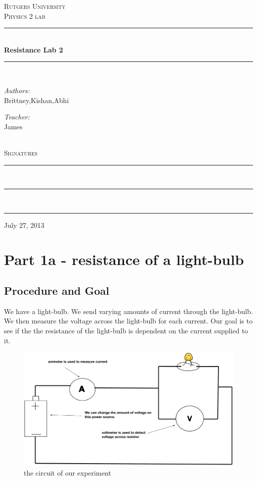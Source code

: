 \documentclass[12pt]{article}
\begin{document}
\begin{titlepage}
\begin{center}
	\textsc{\LARGE Rutgers University}\\[1.5 cm]
    \textsc{\Large Physics 2 lab}\\[0.5cm]
    \rule{\linewidth}{0.5mm} \\ [.4 cm]
    {\huge \bfseries Resistance Lab 2}\\[.4 cm]
    \rule{\linewidth}{0.5mm} \\ [1.5 cm]
    \begin{minipage}{0.4\textwidth}
	\begin{flushleft} \large
	\emph{Authors:}\\
	Brittney,Kishan,Abhi
	\end{flushleft}
	\end{minipage}
	\begin{minipage}{0.4\textwidth}
	\begin{flushright} \large
	\emph{Teacher:} \\
	James
	\end{flushright}
	\end{minipage}\\[2 cm]
	\textsc{ \Large Signatures} \\[1.7 cm] 
	\rule{10 cm}{0.5mm} \\ [2.0 cm]
	\rule{10 cm}{0.5mm} \\ [2.0 cm]
	\rule{10 cm}{0.5mm}
	\vfill
	{\large {July 27, 2013}}
\end{center}
\end{titlepage}

\section*{Part 1a - resistance of a light-bulb}
\subsection*{Procedure and Goal}
 We have a light-bulb. We send varying amounts of current through the light-bulb. We then measure the voltage across the light-bulb for each current. Our goal is to see if the the resistance of the light-bulb is dependent on the current supplied to it. 

 \begin{figure}[h]
	 \centering
	 \includegraphics[scale = .35]{figOne}
	 \caption{the circuit of our experiment}
  \end{figure}
\end{document}
